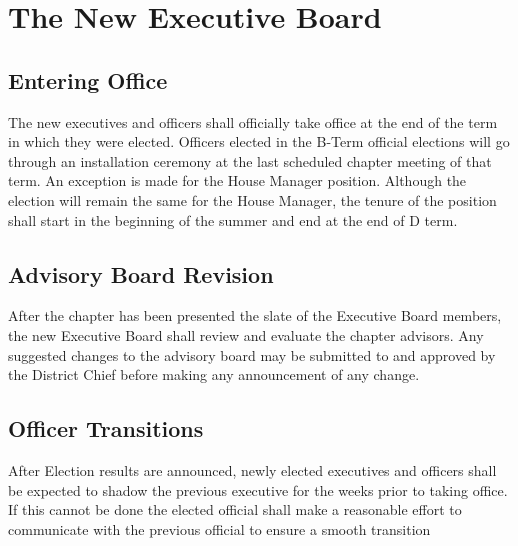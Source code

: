 \chapter{The New Executive Board}
\label{cha:the-new-executive-board}

\section{Entering Office}
\label{sec:entering-office}

The new executives and officers shall officially take office at the end of the
term in which they were elected.
Officers elected in the B-Term official elections will go through an
installation ceremony at the last scheduled chapter meeting of that term.
An exception is made for the House Manager position.
Although the election will remain the same for the House Manager, the tenure of
the position shall start in the beginning of the summer and end at the end of D
term.

\section{Advisory Board Revision}
\label{sec:advisory-board-revision}

After the chapter has been presented the slate of the Executive Board members,
the new Executive Board shall review and evaluate the chapter advisors.
Any suggested changes to the advisory board may be submitted to and approved by
the District Chief before making any announcement of any change.

\section{Officer Transitions}
\label{sec:officer-transitions}

After Election results are announced, newly elected executives and officers
shall be expected to shadow the previous executive for the weeks prior to taking
office.
If this cannot be done the elected official shall make a reasonable effort to
communicate with the previous official to ensure a smooth transition

